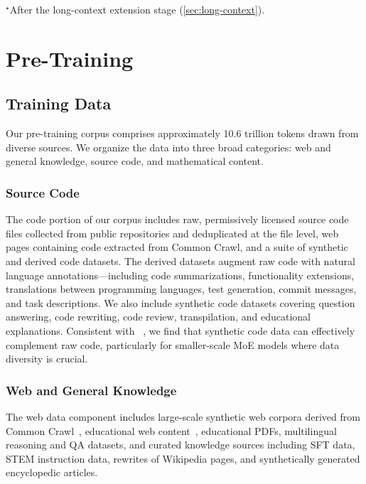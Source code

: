 \documentclass{llmxive}
\providecommand{\modelname}{\textsc{Mellum~2}\xspace}
\begin{document}
\begin{table}[!tb]
  \vspace{4pt}
  {\footnotesize $^{\star}$After the long-context extension stage
  (\cref{sec:long-context}).}
\caption{Architecture configuration of \modelname.}
\label{tab:model-config}
\end{table}


\section{Pre-Training}
\label{sec:pretraining}

\subsection{Training Data}
\label{sec:data}

Our pre-training corpus comprises approximately 10.6 trillion tokens drawn from
diverse sources. We organize the data into three broad categories: web and
general knowledge, source code, and mathematical content.

\subsubsection{Source Code}

The code portion of our corpus includes raw, permissively licensed source code files
collected from public repositories and deduplicated at the file level, web pages
containing code extracted from Common Crawl, and a suite of synthetic and derived code
datasets. The derived datasets augment raw code with natural language
annotations---including code summarizations, functionality extensions,
translations between programming languages, test generation, commit messages,
and task descriptions. We also include synthetic code datasets covering
question answering, code rewriting, code review, transpilation, and
educational explanations. Consistent with ~\cite{hui2024qwen25coder}, we find that
synthetic code data can effectively complement raw code, particularly for
smaller-scale MoE models where data diversity is crucial.

\subsubsection{Web and General Knowledge}

The web data component includes large-scale synthetic web corpora derived
from Common Crawl~\cite{su2024nemotroncc}, educational web
content~\cite{penedo2024fineweb}, educational PDFs, multilingual reasoning
and QA datasets, and curated knowledge sources including SFT data, STEM
instruction data, rewrites of Wikipedia pages, and synthetically generated encyclopedic articles.
\end{document}
